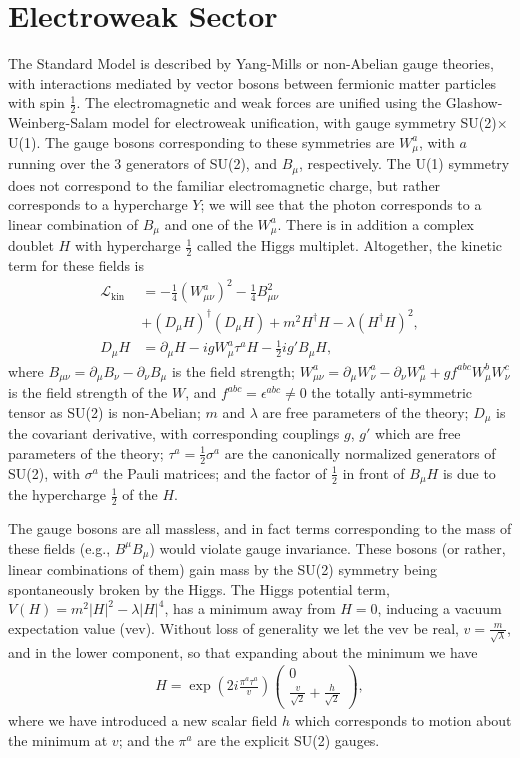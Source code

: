 \section{Electroweak Sector}
\label{sec:SM:EW}
The Standard Model is described by Yang-Mills or non-Abelian gauge theories, with interactions mediated by vector bosons between fermionic matter particles with spin $\frac{1}{2}$.
The electromagnetic and weak forces are unified using the Glashow-Weinberg-Salam model for electroweak unification, with gauge symmetry SU(2)$\times$U(1).
The gauge bosons corresponding to these symmetries are $W_\mu^a$, with $a$ running over the $3$ generators of SU(2), and $B_\mu$, respectively.
The U(1) symmetry does not correspond to the familiar electromagnetic charge, but rather corresponds to a hypercharge $Y$; we will see that the photon corresponds to a linear combination of $B_\mu$ and one of the $W_\mu^a$.
There is in addition a complex doublet $H$ with hypercharge $\frac{1}{2}$ called the Higgs multiplet.
Altogether, the kinetic term for these fields is
\begin{align}
  \mathcal{L}_\text{kin} &= -\frac{1}{4}(W_{\mu\nu}^a)^2 -\frac{1}{4}B_{\mu\nu}^2\nonumber\\
              &+(D_\mu H)^\dagger(D_\mu H) + m^2 H^\dagger H - \lambda (H^\dagger H)^2,\\
              D_\mu H &= \partial_\mu H - igW_\mu^a\tau^aH - \frac{1}{2}ig'B_\mu H,
\end{align}
where $B_{\mu\nu} = \partial_\mu B_\nu - \partial_\nu B_\mu$ is the field strength;
$W_{\mu\nu}^a = \partial_\mu W_\nu^a - \partial_\nu W_\mu^a + gf^{abc}W_\mu^bW_\nu^c$ is the field strength of the $W$, and $f^{abc} = \epsilon^{abc} \ne 0$ the totally anti-symmetric tensor as SU(2) is non-Abelian;
$m$ and $\lambda$ are free parameters of the theory;
$D_\mu$ is the covariant derivative, with corresponding couplings $g$, $g'$ which are free parameters of the theory;
$\tau^a = \frac{1}{2}\sigma^a$ are the canonically normalized generators of SU(2), with $\sigma^a$ the Pauli matrices;
and the factor of $\frac{1}{2}$ in front of $B_\mu H$ is due to the hypercharge $\frac{1}{2}$ of the $H$.

The gauge bosons are all massless, and in fact terms corresponding to the mass of these fields (e.g., $B^\mu B_\mu$) would violate gauge invariance.
These bosons (or rather, linear combinations of them) gain mass by the SU(2) symmetry being spontaneously broken by the Higgs.
The Higgs potential term, $V(H) = m^2 |H|^2 - \lambda |H|^4$, has a minimum away from $H=0$, inducing a vacuum expectation value (vev).
Without loss of generality we let the vev be real, $v=\frac{m}{\sqrt{\lambda}}$, and in the lower component, so that expanding about the minimum we have
\begin{align}
H = \exp\left(2i\frac{\pi^a\tau^a}{v}\right) \begin{pmatrix}0\\\frac{v}{\sqrt{2}}+\frac{h}{\sqrt{2}}\end{pmatrix},
\end{align}
where we have introduced a new scalar field $h$ which corresponds to motion about the minimum at $v$; and the $\pi^a$ are the explicit SU(2) gauges.

